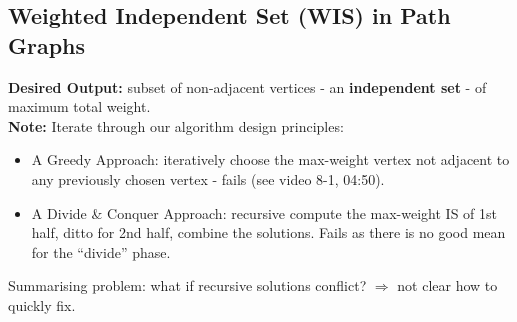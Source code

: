 \documentclass{scrartcl}
\begin{document}
\subsection{Weighted Independent Set (WIS) in Path Graphs}
\label{sec:8-1-1}
{\bf Desired Output: } subset of non-adjacent vertices - an {\bf independent set
} - of maximum total weight.\\
{\bf Note: } Iterate through our algorithm design principles:
\begin{itemize}
\item A Greedy Approach: iteratively choose the max-weight vertex not adjacent
  to any previously chosen vertex - fails (see video 8-1, 04:50).
\item A Divide \& Conquer Approach: recursive compute the max-weight IS of 1st
  half, ditto for 2nd half, combine the solutions. Fails as there is no good
  mean for the ``divide'' phase.
\end{itemize}
Summarising problem: what if recursive solutions conflict? $\Rightarrow $ not
clear how to quickly fix.

\end{document}
